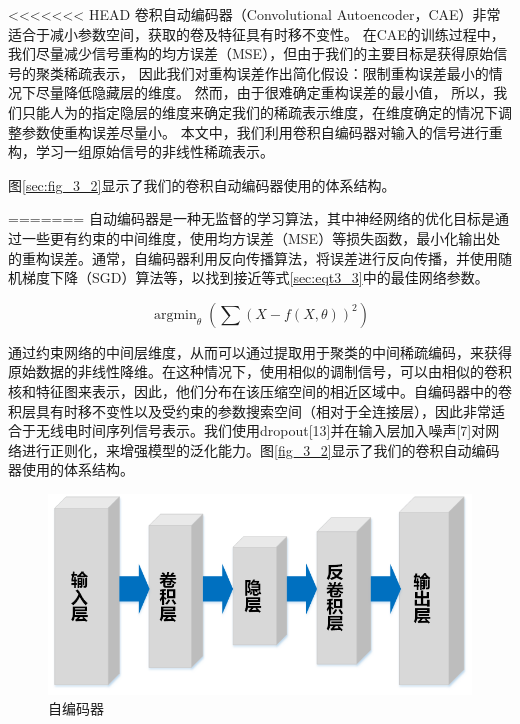 <<<<<<< HEAD
卷积自动编码器（Convolutional Autoencoder，CAE）非常适合于减小参数空间，获取的卷及特征具有时移不变性。
在CAE的训练过程中，我们尽量减少信号重构的均方误差（MSE），但由于我们的主要目标是获得原始信号的聚类稀疏表示，
因此我们对重构误差作出简化假设：限制重构误差最小的情况下尽量降低隐藏层的维度。
然而，由于很难确定重构误差的最小值，
所以，我们只能人为的指定隐层的维度来确定我们的稀疏表示维度，在维度确定的情况下调整参数使重构误差尽量小。
本文中，我们利用卷积自编码器对输入的信号进行重构，学习一组原始信号的非线性稀疏表示。\par
图\ref{sec:fig_3_2}显示了我们的卷积自动编码器使用的体系结构。\par
=======
自动编码器是一种无监督的学习算法，其中神经网络的优化目标是通过一些更有约束的中间维度，使用均方误差（MSE）等损失函数，最小化输出处的重构误差。通常，自编码器利用反向传播算法，将误差进行反向传播，并使用随机梯度下降（SGD）算法等，以找到接近等式\ref{sec:eqt3_3}中的最佳网络参数。

\begin{equation}\label{sec:eqt3_4}
	\mathop{\arg\min}_{\theta}(\sum(X − f (X,\theta))^2)
\end{equation}

通过约束网络的中间层维度，从而可以通过提取用于聚类的中间稀疏编码，来获得原始数据的非线性降维。在这种情况下，使用相似的调制信号，可以由相似的卷积核和特征图来表示，因此，他们分布在该压缩空间的相近区域中。自编码器中的卷积层具有时移不变性以及受约束的参数搜索空间（相对于全连接层），因此非常适合于无线电时间序列信号表示。我们使用dropout[13]并在输入层加入噪声[7]对网络进行正则化，来增强模型的泛化能力。图\ref{fig_3_2}显示了我们的卷积自动编码器使用的体系结构。\par

\begin{figure}[!h]
	\centering
	\includegraphics[scale=0.6]{figures/chapter_3/fig_3_3}
	\caption{自编码器}	\label{sec:fig_3_5}
\end{figure}

